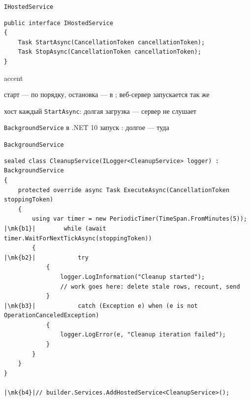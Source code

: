 \documentclass[aspectratio=169,10pt,t]{beamer}
\newcommand{\mk}[1]{\tikz[remember picture,overlay]\coordinate (#1) at (0,0.55ex);}
\begin{document}
\begin{frame}[fragile]{\texttt{IHostedService}}
  \slidetop

\begin{lstlisting}[style=csharp,basicstyle=\ttfamily\small]
public interface IHostedService
{
    Task StartAsync(CancellationToken cancellationToken);
    Task StopAsync(CancellationToken cancellationToken);
}
\end{lstlisting}

  \slidegap
  \begin{cbul}{accent}
    \item старт --- по порядку, остановка --- в ; веб-сервер
      запускается так же
    \item хост  каждый \texttt{StartAsync}: долгая загрузка --- сервер
      не слушает
    \item \texttt{BackgroundService} в .NET 10 запуск : долгое ---
      туда
  \end{cbul}
\end{frame}

\begin{frame}[fragile]{\texttt{BackgroundService}}
  \vspace{0.3em}
\begin{lstlisting}[style=csharp,basicstyle=\ttfamily\fontsize{6.8}{7.8}\selectfont,escapechar=|]
sealed class CleanupService(ILogger<CleanupService> logger) : BackgroundService
{
    protected override async Task ExecuteAsync(CancellationToken stoppingToken)
    {
        using var timer = new PeriodicTimer(TimeSpan.FromMinutes(5));
|\mk{b1}|        while (await timer.WaitForNextTickAsync(stoppingToken))
        {
|\mk{b2}|            try
            {
                logger.LogInformation("Cleanup started");
                // work goes here: delete stale rows, recount, send
            }
|\mk{b3}|            catch (Exception e) when (e is not OperationCanceledException)
            {
                logger.LogError(e, "Cleanup iteration failed");
            }
        }
    }
}

|\mk{b4}|// builder.Services.AddHostedService<CleanupService>();
\end{lstlisting}
\end{frame}
\end{document}
